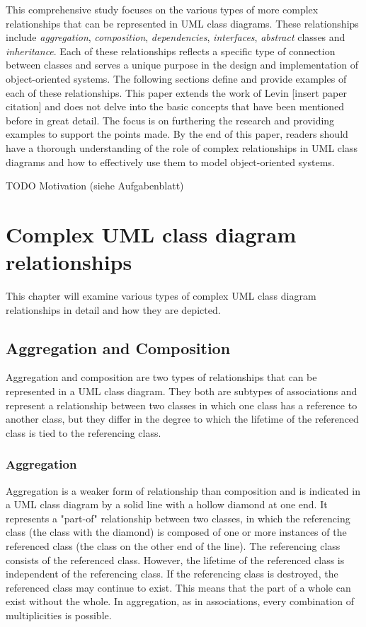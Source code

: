 \documentclass[
	12pt,
    a4paper,
    egregdoesnotlikesansseriftitles, %
    toc=chapterentrywithdots,
    oneside, openany,
    titlepage,
    parskip=half,
    headings=normal,  %
    listof=totoc,
    bibliography=totoc,
    index=totoc,
    captions=tableheading,  %
    listof=flat,
    numbers=noenddot, %
    final]
    {scrbook}
\begin{document}
This comprehensive study focuses on the various types of more complex relationships that can be represented in UML class diagrams. 
These relationships include \emph{aggregation}, \emph{composition}, \emph{dependencies}, \emph{interfaces}, \emph{abstract} classes and \emph{inheritance}. 
Each of these relationships reflects a specific type of connection between classes and serves a unique purpose in the design and implementation of object-oriented systems. 
The following sections define and provide examples of each of these relationships.
This paper extends the work of Levin [insert paper citation] and does not delve into the basic concepts that have been mentioned before in great detail. The focus is on furthering the research and providing examples to support the points made.
By the end of this paper, readers should have a thorough understanding of the role of complex relationships in UML class diagrams and how to effectively use them to model object-oriented systems.

TODO Motivation (siehe Aufgabenblatt)

\chapter{Complex UML class diagram relationships}
This chapter will examine various types of complex UML class diagram relationships in detail and how they are depicted.


\section{Aggregation and Composition}
Aggregation and composition are two types of relationships that can be represented in a UML class diagram. 
They both are subtypes of associations and represent a relationship between two classes in which one class has a reference to another class, but they differ in the degree to which the lifetime of the referenced class is tied to the referencing class.


\subsection{Aggregation}
Aggregation is a weaker form of relationship than composition and is indicated in a UML class diagram by a solid line with a hollow diamond at one end. 
It represents a "part-of" relationship between two classes, in which the referencing class (the class with the diamond) is composed of one or more instances of the referenced class (the class on the other end of the line).
The referencing class consists of the referenced class.
However, the lifetime of the referenced class is independent of the referencing class.
If the referencing class is destroyed, the referenced class may continue to exist.
This means that the part of a whole can exist without the whole.
In aggregation, as in associations, every combination of multiplicities is possible.
\end{document}
